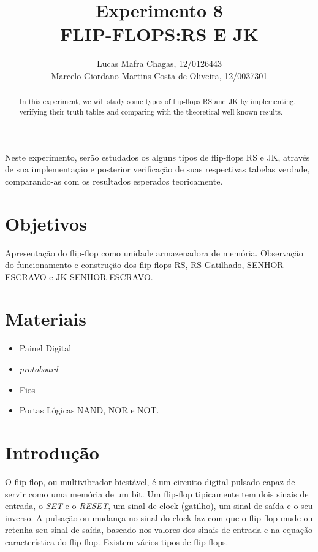 \documentclass[12pt]{article}
\title{Experimento 8\\ 
	FLIP-FLOPS:RS E JK}
\author{
	Lucas Mafra Chagas, 12/0126443 \\
	Marcelo Giordano Martins Costa de Oliveira,  12/0037301
}
\begin{document}
 

\maketitle

 \begin{abstract}
	 In this experiment, we will study some types of flip-flops RS and JK by implementing, verifying their truth tables and comparing with the theoretical well-known results.
 \end{abstract}
     
 \begin{resumo} 
	 Neste experimento, serão estudados os alguns tipos de flip-flops RS e JK, através de sua implementação e posterior verificação de suas respectivas tabelas verdade, comparando-as com os resultados esperados teoricamente.
 \end{resumo}


\section{Objetivos}
\label{sec:Objetivos}

Apresentação do flip-flop como unidade armazenadora de memória. Observação do funcionamento e construção dos flip-flops RS, RS Gatilhado, SENHOR-ESCRAVO e JK SENHOR-ESCRAVO.

\section{Materiais} 
\label{sec:Materiais}

\begin{itemize}
    \item Painel Digital
    
    \item \textit{protoboard}
    
    \item Fios
    
    \item Portas Lógicas NAND, NOR e NOT.
    
\end{itemize}


\section{Introdução}
\label{sec:Introducao}

O flip-flop, ou multivibrador biestável, é um circuito digital pulsado capaz de servir como uma memória de um bit. Um flip-flop tipicamente tem dois sinais de entrada, o \textit{SET} e o \textit{RESET}, um sinal de clock (gatilho), um sinal de saída e o seu inverso. A pulsação ou mudança no sinal do clock faz com que o flip-flop mude ou retenha seu sinal de saída, baseado nos valores dos sinais de entrada e na equação característica do flip-flop. Existem vários tipos de flip-flops.
\end{document}
